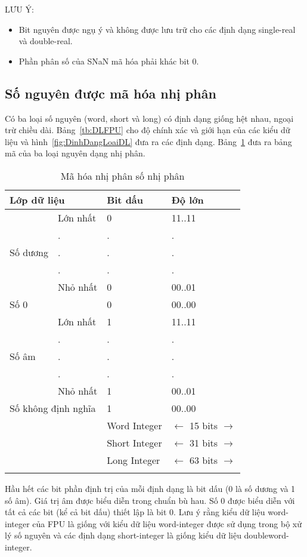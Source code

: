	LƯU Ý:
	\begin{itemize}
		\item[1] Bit nguyên được ngụ ý và không được lưu trữ cho các định dạng single-real và double-real.
		 \item[2] Phần phân số của SNaN mã hóa phải khác bit 0.
	\end{itemize}

		\subsection*{ Số nguyên được mã hóa nhị phân}
	Có ba loại số nguyên (word, short và long) có định dạng giống hệt nhau, ngoại trừ chiều dài. Bảng~\ref{tb:DLFPU} cho độ chính xác và giới hạn của các kiểu dữ liệu và hình~\ref{fig:DinhDangLoaiDL} đưa ra các định dạng. Bảng~\ref{tb:MaHoaNhiPhan} đưa ra bảng mã của ba loại nguyên dạng nhị phân.
		\begin{longtable}{|l|l|l|l|}
			\hline
				\multicolumn{2}{|l|}{Lớp dữ liệu} & Bit dấu & Độ lớn \\
			\hline
			\hline
					 & Lớn nhất & 0 & 11..11 \\				
					& . & . &. \\
					Số dương& . & . &. \\
					& . & . &. \\
					 & Nhỏ nhất & 0 & 00..01 \\				
			\hline
				\multicolumn{2}{|l|}{Số 0} & 0 &00..00 \\
			\hline
					 & Lớn nhất & 1 & 11..11 \\				
					& . & . &. \\
					Số âm & . & . &. \\
					& . & . &. \\
					 & Nhỏ nhất & 1 & 00..01 \\	
			\hline
				\multicolumn{2}{|l|}{Số không định nghĩa} & 1 &00..00 \\
			\hline
				\multicolumn{2}{l}{} & Word Integer & $\leftarrow$ 15 bits $\to $ \\
				\multicolumn{2}{l}{} & Short Integer & $\leftarrow$ 31 bits $\to $ \\
				\multicolumn{2}{l}{} & Long Integer & $\leftarrow$ 63 bits $\to $ \\
				\caption{Mã hóa nhị phân số nhị phân}
				\label{tb:MaHoaNhiPhan}
		\end{longtable}	

	\newpage
	Hầu hết các bit phần định trị của mỗi định dạng là bit dấu (0 là số dương và 1 số âm). Giá trị âm được biểu diễn trong chuẩn bù hau. Số 0 được biểu diễn với tất cả các bit (kể cả bit dấu) thiết lập là bit 0. Lưu ý rằng kiểu dữ liệu word-integer của FPU là giống với kiểu dữ liệu word-integer được sử dụng trong bộ xử lý số nguyên và các định dạng short-integer là giống kiểu dữ liệu doubleword-integer.\\
	
